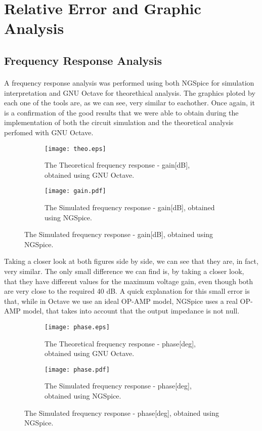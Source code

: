 \section{Relative Error and Graphic Analysis}
\label{error}

\subsection{Frequency Response Analysis}
\label{subsec:freqresp}

\paragraph{}
A frequency response analysis was performed using both NGSpice for simulation interpretation and GNU Octave for theorethical analysis. The graphics ploted by each one of the tools are, as we can see, very similar to eachother. Once again, it is a confirmation of the good results that we were able to obtain during the implementation of both the circuit simulation and the theoretical analysis perfomed with GNU Octave.

\begin{figure}[H]
\begin{subfigure}{0.5\textwidth}
\texttt{[image: theo.eps]} 
\caption{The Theoretical frequency response - gain[dB], obtained using GNU Octave.}
\label{fig:theo_third}
\end{subfigure}
\begin{subfigure}{0.5\textwidth}
\texttt{[image: gain.pdf]}
\caption{The Simulated frequency response - gain[dB], obtained using NGSpice.}
\label{fig:total}
\end{subfigure}
\end{figure}

Taking a closer look at both figures side by side, we can see that they are, in fact, very similar. The only small difference we can find is, by taking a closer look, that they have different values for the maximum voltage gain, even though both are very close to the required 40 dB. A quick explanation for this small error is that, while in Octave we use an ideal OP-AMP model, NGSpice uses a real OP-AMP model, that takes into account that the output impedance is not null.

\begin{figure}[H]
\begin{subfigure}{0.5\textwidth}
\texttt{[image: phase.eps]} 
\caption{The Theoretical frequency response - phase[deg], obtained using GNU Octave.}
\label{fig:theo_fourth}
\end{subfigure}
\begin{subfigure}{0.5\textwidth}
\texttt{[image: phase.pdf]}
\caption{The Simulated frequency response - phase[deg], obtained using NGSpice.}
\label{fig:theo_fifth}
\end{subfigure}
\end{figure}

